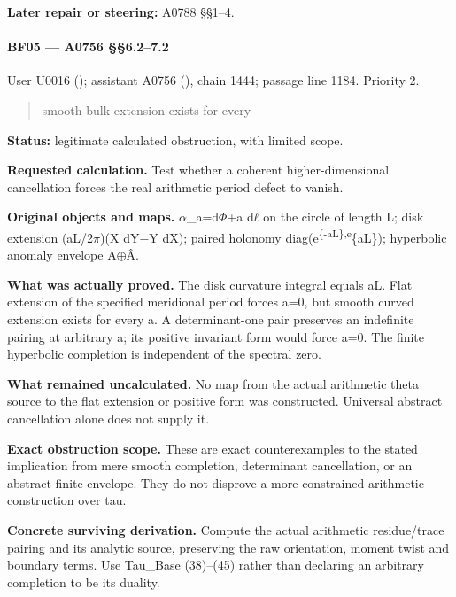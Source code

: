\textbf{Later repair or steering:} A0788 §§1--4.

\paragraph{BF05 --- A0756 §§6.2--7.2}\label{bf05-a0756-6.27.2}

User U0016 (\protect{});
assistant A0756 (\protect{}),
chain 1444; passage line 1184. Priority 2.

\begin{quote}
smooth bulk extension exists for every
\end{quote}

\textbf{Status:} legitimate calculated obstruction, with limited scope.

\textbf{Requested calculation.} Test whether a coherent
higher-dimensional cancellation forces the real arithmetic period defect
to vanish.

\textbf{Original objects and maps.}
\allowbreak{}\ensuremath{α}\allowbreak{}\_a=d\allowbreak{}\ensuremath{Φ}\allowbreak{}+a
d\allowbreak{}\ensuremath{ℓ}\allowbreak{} on the circle of length L;
disk extension (aL/2\allowbreak{}\ensuremath{π}\allowbreak{})(X
dY\allowbreak{}\ensuremath{−}\allowbreak{}Y dX); paired holonomy
diag(e\textsuperscript{\{-aL\},e}\{aL\}); hyperbolic anomaly envelope
A\allowbreak{}\ensuremath{⊕}\allowbreak{}Â.

\textbf{What was actually proved.} The disk curvature integral equals
aL. Flat extension of the specified meridional period forces a=0, but
smooth curved extension exists for every a. A determinant-one pair
preserves an indefinite pairing at arbitrary a; its positive invariant
form would force a=0. The finite hyperbolic completion is independent of
the spectral zero.

\textbf{What remained uncalculated.} No map from the actual arithmetic
theta source to the flat extension or positive form was constructed.
Universal abstract cancellation alone does not supply it.

\textbf{Exact obstruction scope.} These are exact counterexamples to the
stated implication from mere smooth completion, determinant
cancellation, or an abstract finite envelope. They do not disprove a
more constrained arithmetic construction over tau.

\textbf{Concrete surviving derivation.} Compute the actual arithmetic
residue/trace pairing and its analytic source, preserving the raw
orientation, moment twist and boundary terms. Use Tau\_Base (38)--(45)
rather than declaring an arbitrary completion to be its duality.

